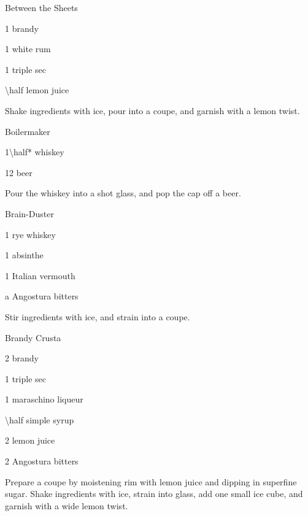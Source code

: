 \begin{Cocktail}{Between the Sheets}
  \begin{Ingredients}
  \item \SI{1}{\oz} brandy
  \item \SI{1}{\oz} white rum
  \item \SI{1}{\oz} triple sec
  \item \SI{\half}{\oz} lemon juice
  \end{Ingredients}
  
  \begin{Instructions}
	Shake ingredients with ice, pour into a coupe, and garnish with a lemon twist.
  \end{Instructions}
\end{Cocktail}

\begin{Cocktail}{Boilermaker}
  \begin{Ingredients}
  \item \SI{1\half*}{\oz} whiskey
  \item \SI{12}{\oz} beer
  \end{Ingredients}
  
  \begin{Instructions}
	Pour the whiskey into a shot glass, and pop the cap off a beer.
  \end{Instructions}
\end{Cocktail}

\begin{Cocktail}{Brain-Duster}
  \begin{Ingredients}
  \item \SI{1}{\oz} rye whiskey
  \item \SI{1}{\oz} absinthe
  \item \SI{1}{\oz} Italian vermouth
  \item a \si{\dash} Angostura bitters
  \end{Ingredients}
  
  \begin{Instructions}
	Stir ingredients with ice, and strain into a coupe.
  \end{Instructions}
\end{Cocktail}

\begin{Cocktail}{Brandy Crusta}
  \begin{Ingredients}
  \item \SI{2}{\oz} brandy
  \item \SI{1}{\tsp} triple sec
  \item \SI{1}{\tsp} maraschino liqueur
  \item \SI{\half}{\tsp} simple syrup
  \item \SI{2}{\tsp} lemon juice
  \item 2 \si{\dashes} Angostura bitters
  \end{Ingredients}
  
  \begin{Instructions}
	Prepare a coupe by moistening rim with lemon juice and dipping in superfine sugar.  Shake ingredients with ice, strain into glass, add one small ice cube, and garnish with a wide lemon twist.
  \end{Instructions}
\end{Cocktail}

